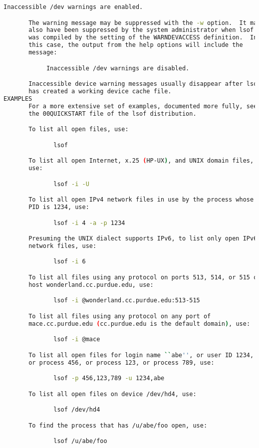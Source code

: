 {{\begin{lstlisting}[language=bash]
            Inaccessible /dev warnings are enabled.

       The warning message may be suppressed with the -w option.  It may
       also have been suppressed by the system administrator when lsof
       was compiled by the setting of the WARNDEVACCESS definition.  In
       this case, the output from the help options will include the
       message:

            Inaccessible /dev warnings are disabled.

       Inaccessible device warning messages usually disappear after lsof
       has created a working device cache file.
EXAMPLES
       For a more extensive set of examples, documented more fully, see
       the 00QUICKSTART file of the lsof distribution.

       To list all open files, use:

              lsof

       To list all open Internet, x.25 (HP-UX), and UNIX domain files,
       use:

              lsof -i -U

       To list all open IPv4 network files in use by the process whose
       PID is 1234, use:

              lsof -i 4 -a -p 1234

       Presuming the UNIX dialect supports IPv6, to list only open IPv6
       network files, use:

              lsof -i 6

       To list all files using any protocol on ports 513, 514, or 515 of
       host wonderland.cc.purdue.edu, use:

              lsof -i @wonderland.cc.purdue.edu:513-515

       To list all files using any protocol on any port of
       mace.cc.purdue.edu (cc.purdue.edu is the default domain), use:

              lsof -i @mace

       To list all open files for login name ``abe'', or user ID 1234,
       or process 456, or process 123, or process 789, use:

              lsof -p 456,123,789 -u 1234,abe

       To list all open files on device /dev/hd4, use:

              lsof /dev/hd4

       To find the process that has /u/abe/foo open, use:

              lsof /u/abe/foo


\end{lstlisting}}}

